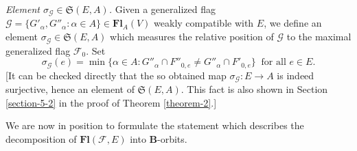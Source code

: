 \documentclass[12pt]{amsart}
\theoremstyle{definition}
\begin{document}
{\it Element $\sigma_\mathcal{G}\in\mathfrak{S}(E,A)$.}
Given a generalized flag $\mathcal{G}=\{G'_\alpha,G''_\alpha:\alpha\in A\}\in\mathbf{Fl}_A(V)$ weakly compatible with $E$, we define an element $\sigma_\mathcal{G}\in\mathfrak{S}(E,A)$ which measures the relative position of $\mathcal{G}$ to the maximal generalized flag $\mathcal{F}_0$.
Set
\begin{equation}
\label{definition-sigmaG}
\sigma_\mathcal{G}(e)=\min\{\alpha\in A:G''_\alpha\cap F''_{0,e}\not= G''_\alpha\cap F'_{0,e}\} \ \mbox{ for all $e\in E$}.
\end{equation}
[It can be checked directly that the so obtained map $\sigma_\mathcal{G}:E\to A$  is indeed surjective, hence an element of $\mathfrak{S}(E,A)$. This fact is also shown in Section \ref{section-5-2} in the proof of Theorem \ref{theorem-2}.]

We are now in position to formulate the statement which describes the decomposition of $\mathbf{Fl}(\mathcal{F},E)$ into $\mathbf{B}$-orbits.
\end{document}
